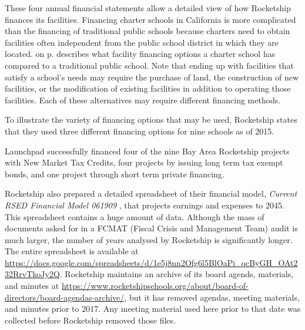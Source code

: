 These four annual financial statements allow a detailed view of how Rocketship finances its facilities. Financing charter schools in California is more complicated than the financing of traditional public schools because charters need to obtain facilities often independent from the public school district in which they are located.
 on p.\pageref{tab:charter-school-financing} describes what facility financing options a charter school has compared to a traditional public school. Note that ending up with facilities that satisfy a school's needs may require the purchase of land, the construction of new facilities, or the modification of existing facilities in addition to operating those facilities. Each of these alternatives may require different financing methods.

To illustrate the variety of financing options that may be used, Rocketship states that they used three different financing options for nine schools as of 2015.
\begin{displayquote}
Launchpad successfully financed four of the nine Bay Area Rocketship projects with New Market Tax Credits, four projects by issuing long term tax exempt bonds, and one project through short term private financing.
\end{displayquote}

Rocketship also prepared a detailed spreadsheet of their financial model, \textit{Current RSED Financial Model 061909} \parencite{RSED2009a}, that projects earnings and expenses to 2045. This spreadsheet contains a huge amount of data. Although the mass of documents asked for in a FCMAT (Fiscal Crisis and Management Team) audit is much larger, the number of years analysed by Rocketship is significantly longer. The entire spreadsheet is available at \url{https://docs.google.com/spreadsheets/d/1e5j8nn2Ofg6l5BlOaPi_qcByGH_OAt232RrvTkoJy2Q}. Rocketship maintains an archive of its board agends, materials, and minutes at \url{https://www.rocketshipschools.org/about/board-of-directors/board-agendas-archive/}, but it has removed agendas, meeting materials, and minutes prior to 2017. Any meeting material used here prior to that date was collected before Rocketship removed those files.

